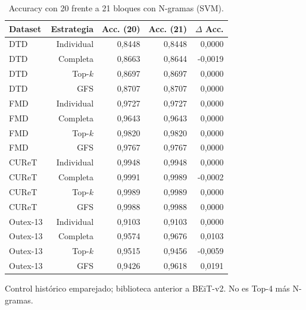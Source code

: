 \begin{table}[!htbp]\centering
\fontsize{8}{10}\selectfont\setlength{\tabcolsep}{4pt}
\caption{Accuracy con 20 frente a 21 bloques con N-gramas (SVM).}\label{tab:ngram-accuracy-svm}
\begin{tabular}{@{}lrrrr@{}}\toprule
Dataset & Estrategia & Acc. (20) & Acc. (21) & $\Delta$ Acc.\\\midrule
DTD & Individual & 0,8448 & 0,8448 & 0,0000\\
DTD & Completa & 0,8663 & 0,8644 & -0,0019\\
DTD & Top-$k$ & 0,8697 & 0,8697 & 0,0000\\
DTD & GFS & 0,8707 & 0,8707 & 0,0000\\
FMD & Individual & 0,9727 & 0,9727 & 0,0000\\
FMD & Completa & 0,9643 & 0,9643 & 0,0000\\
FMD & Top-$k$ & 0,9820 & 0,9820 & 0,0000\\
FMD & GFS & 0,9767 & 0,9767 & 0,0000\\
CUReT & Individual & 0,9948 & 0,9948 & 0,0000\\
CUReT & Completa & 0,9991 & 0,9989 & -0,0002\\
CUReT & Top-$k$ & 0,9989 & 0,9989 & 0,0000\\
CUReT & GFS & 0,9988 & 0,9988 & 0,0000\\
Outex-13 & Individual & 0,9103 & 0,9103 & 0,0000\\
Outex-13 & Completa & 0,9574 & 0,9676 & 0,0103\\
Outex-13 & Top-$k$ & 0,9515 & 0,9456 & -0,0059\\
Outex-13 & GFS & 0,9426 & 0,9618 & 0,0191\\
\bottomrule\end{tabular}
\par\smallskip\begin{minipage}{0.98\textwidth}\footnotesize Control histórico emparejado; biblioteca anterior a BEiT-v2. No es Top-4 más N-gramas.\end{minipage}
\end{table}
